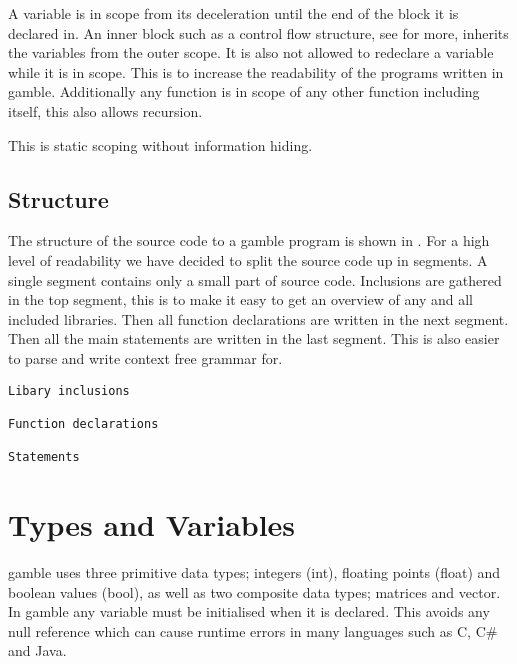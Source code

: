 A variable is in scope from its deceleration until the end of the block it is declared in.
An inner block such as a control flow structure, see  for more, inherits the variables from the outer scope. 
It is also not allowed to redeclare a variable while it is in scope. 
This is to increase the readability of the programs written in \gls{gamble}.
Additionally any function is in scope of any other function including itself, this also allows recursion. 

This is static scoping without information hiding. 

\subsection*{Structure} 
The structure of the source code to a \gls{gamble} program is shown in .
For a high level of readability we have decided  to split the source code up in segments.
A single segment contains only a small part of source code.
Inclusions are gathered in the top segment, this is to make it easy to get an overview of any and all included libraries. 
Then all function declarations are written in the next segment.
Then all the main statements are written in the last segment. 
This is also easier to parse and write context free grammar for.  

\begin{lstlisting}[caption={Source code file layout in \gls{gamble}},frame=tlrb,label={lst:Structure}, numbers=none]
Libary inclusions

Function declarations

Statements
\end{lstlisting}

\section{Types and Variables} \label{sec:Types}
\gls{gamble} uses three primitive data types; integers (int), floating points (float) and boolean values (bool), as well as two composite data types; matrices and vector. 
In \gls{gamble} any variable must be initialised when it is declared. 
This avoids any null reference which can cause runtime errors in many languages such as C, C\# and Java. 

